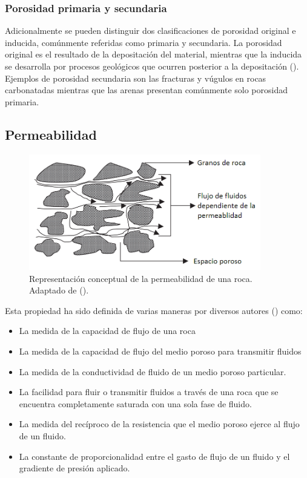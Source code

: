 \subsubsection{Porosidad primaria y secundaria}

Adicionalmente se pueden distinguir dos clasificaciones de porosidad original e inducida, comúnmente referidas como primaria y secundaria. La porosidad original es el resultado de la depositación del material, mientras que la inducida se desarrolla por procesos geológicos que ocurren posterior a la depositación (\cite{Amix}). Ejemplos de porosidad secundaria son las fracturas y vúgulos en rocas carbonatadas mientras que las arenas presentan comúnmente solo porosidad primaria.

\subsection{Permeabilidad} 


\begin{figure}
    \centering
    \includegraphics[width=0.9\textwidth]{Graphics/perme1.png}
    \caption[Concepto de Permeabilidad]{Representación conceptual de la permeabilidad de una roca. Adaptado de (\cite{Dandekar}). }
    \label{fig:perme1}
\end{figure}

Esta propiedad ha sido definida de varias maneras por diversos autores (\cite{Dandekar}) como:

\begin{itemize}
    \item La medida de la capacidad de flujo de una roca 
    \item La medida de la capacidad de flujo del medio poroso para transmitir fluidos
    \item La medida de la conductividad de fluido de un medio poroso particular.
    \item La facilidad para fluir o transmitir fluidos a través de una roca que se encuentra completamente saturada con una sola fase de fluido.
    \item La medida del recíproco de la resistencia que el medio poroso ejerce al flujo de un fluido.
    \item La constante de proporcionalidad entre el gasto de flujo de un fluido y el gradiente de presión aplicado.
\end{itemize}


